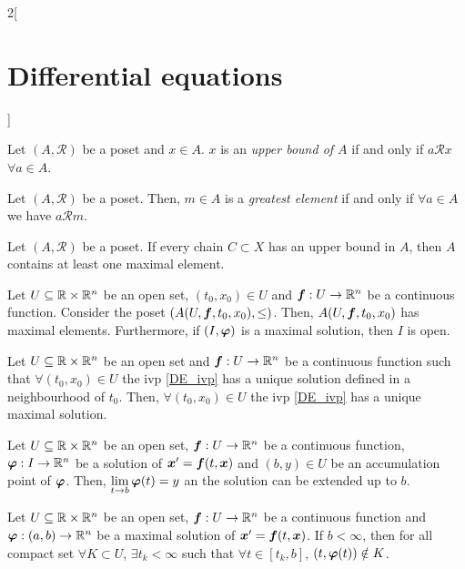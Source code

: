 \documentclass[../../../main.tex]{subfiles}
\begin{document}
\begin{multicols}{2}[\section{Differential equations}]
\begin{definition}
    Let $(A,\mathcal{R})$ be a poset and $x\in A$. $x$ is an \textit{upper bound of $A$} if and only if $a\mathcal{R}x$ $\forall a\in A$.
  \end{definition}
  \begin{definition}
    Let $(A,\mathcal{R})$ be a poset. Then, $m\in A$ is a \textit{greatest element} if and only if $\forall a\in A$ we have $a \mathcal{R} m$.
  \end{definition}
  \begin{lemma}
    Let $(A,\mathcal{R})$ be a poset. If every chain $C\subset X$ has an upper bound in $A$, then $A$ contains at least one maximal element.
  \end{lemma}
  \begin{theorem}
    Let $U\subseteq\mathbb{R}\times\mathbb{R}^n$ be an open set, $(t_0,x_0)\in U$ and $\boldsymbol{f}:U\rightarrow\mathbb{R}^n$ be a continuous function. Consider the poset $(A(U,\boldsymbol{f},t_0,x_0),\leq)$. Then, $A(U,\boldsymbol{f},t_0,x_0)$ has maximal elements. Furthermore, if $(I,\boldsymbol{\varphi})$ is a maximal solution, then $I$ is open.
  \end{theorem}
  \begin{prop}
    Let $U\subseteq\mathbb{R}\times\mathbb{R}^n$ be an open set and $\boldsymbol{f}:U\rightarrow\mathbb{R}^n$ be a continuous function such that $\forall(t_0,x_0)\in U$ the ivp \eqref{DE_ivp} has a unique solution defined in a neighbourhood of $t_0$. Then, $\forall(t_0,x_0)\in U$ the ivp \eqref{DE_ivp} has a unique maximal solution.
  \end{prop}
  \begin{lemma}
    Let $U\subseteq\mathbb{R}\times\mathbb{R}^n$ be an open set, $\boldsymbol{f}:U\rightarrow\mathbb{R}^n$ be a continuous function, $\boldsymbol{\varphi}:I\rightarrow\mathbb{R}^n$ be a solution of $\boldsymbol{x}'=\boldsymbol{f}(t,\boldsymbol{x})$ and $(b,y)\in U$ be an accumulation point of $\boldsymbol{\varphi}$. Then, $\displaystyle\lim_{t\to b}\boldsymbol{\varphi}(t)=y$ an the solution can be extended up to $b$.
  \end{lemma}
  \begin{prop}
    Let $U\subseteq\mathbb{R}\times\mathbb{R}^n$ be an open set, $\boldsymbol{f}:U\rightarrow\mathbb{R}^n$ be a continuous function and $\boldsymbol{\varphi}:(a,b)\rightarrow\mathbb{R}^n$ be a maximal solution of $\boldsymbol{x}'=\boldsymbol{f}(t,\boldsymbol{x})$. If $b<\infty$, then for all compact set $\forall K\subset U$, $\exists t_k<\infty$ such that $\forall t\in[t_k,b]$, $(t,\boldsymbol{\varphi}(t))\notin K$.
  \end{prop}
\end{multicols}
\end{document}
